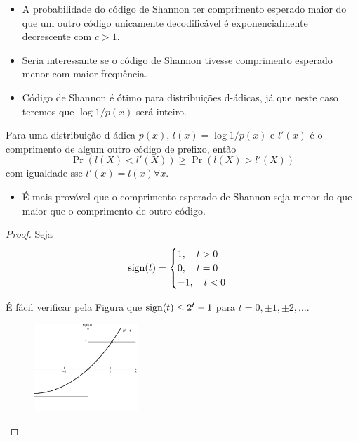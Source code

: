 \begin{frame}[allowframebreaks]
  \begin{itemize}
  \item A probabilidade do código de Shannon ter comprimento esperado maior do que um outro 
	código unicamente decodificável é exponencialmente decrescente com $c > 1$.
  \item Seria interessante se o código de Shannon tivesse comprimento esperado menor com maior frequência.
  \item Código de Shannon é ótimo para distribuições d-ádicas, já que neste caso teremos que $\log 1/p(x)$ será inteiro.
  \end{itemize}

  \begin{theorem}
  Para uma distribuição d-ádica $p(x)$, $l(x) = \log 1/p(x)$ e $l'(x)$ é o comprimento de algum outro código de prefixo, então
	\begin{equation}
	\Pr \left( l(X) < l'(X) \right) \geq \Pr \left( l(X) > l'(X) \right)
	\end{equation}
  com igualdade sse $l'(x)=l(x) \forall x$.
  \end{theorem}
  \begin{itemize}
  \item É mais provável que o comprimento esperado de Shannon seja menor do que maior que o comprimento de outro código.
  \end{itemize}

   \begin{proof}
   Seja 
	\begin{equation}
	\operatorname{sign}(t) = \begin{cases} 
		1 , \quad t > 0 \\
		0 , \quad t = 0 \\
		-1 , \quad t < 0
		\end{cases}
	\end{equation}

   \proofbreak
   
   É fácil verificar pela Figura que $\operatorname{sign}(t) \leq 2^t -1$ para $t=0,\pm 1, \pm 2, \ldots$.
        \begin{figure}[h!]
        \centering
        \includegraphics[width=0.35\textwidth]{images/sign.pdf}
        \label{fig:sign}
        \end{figure}
  

\end{proof}
\end{frame}
